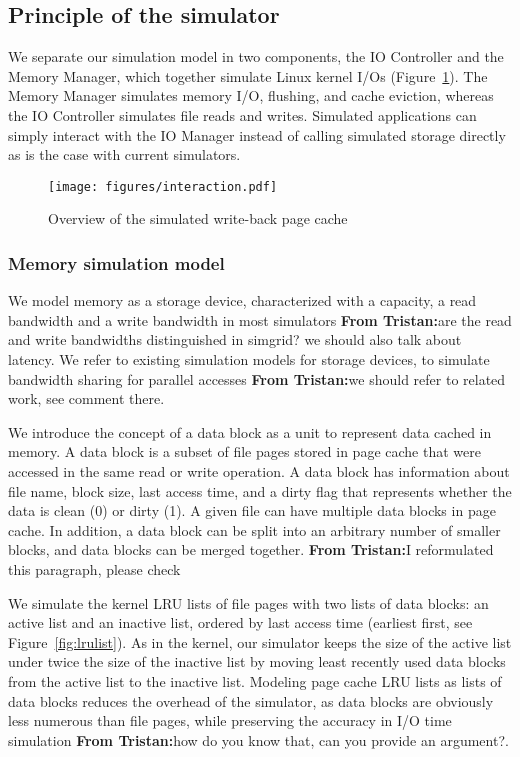 \documentclass[conference]{IEEEtran}
\newcommand{\tristan}[1]{\color{orange}\textbf{From Tristan:}#1\color{black}}
\begin{document}
		\subsection{Principle of the simulator}
	
            We separate our simulation model in two components, the IO
			Controller and the Memory Manager, which together simulate Linux
			kernel I/Os (Figure~\ref{fig:interaction}). The Memory Manager
			simulates memory I/O, flushing, and cache eviction, whereas the IO
			Controller simulates file reads and writes. Simulated applications
			can simply interact with the IO Manager instead of calling simulated
			storage directly as is the case with current simulators.

			\begin{figure}
   				\centering
   				\texttt{[image: figures/interaction.pdf]}
   				\caption{Overview of the simulated write-back page cache}\label{fig:interaction}
			\end{figure}	

			\subsubsection{Memory simulation model}
			
			We model memory as a storage device, characterized with a capacity,
			a read bandwidth and a write bandwidth in most simulators
			\tristan{are the read and write bandwidths distinguished in simgrid?
			we should also talk about latency}. We refer to existing simulation
			models for storage devices, to simulate bandwidth sharing for
			parallel accesses \tristan{we should refer to related work, see
			comment there}.

			We introduce the concept of a data block as a unit to represent data
			cached in memory. A data block is a subset of file pages stored in
			page cache that were accessed in the same read or write
			operation. A data block
			has information about file name, block size, last access time, and a
			dirty flag that represents whether the data is clean (0) or dirty
			(1). A given file can have multiple data blocks in page cache. In
			addition, a data block can be split into an arbitrary number of
			smaller blocks, and data blocks can be merged together.
			\tristan{I reformulated this paragraph, please check}
			
			We simulate the kernel LRU lists of file pages
			with two lists of data blocks: an active list and 
			an inactive list, ordered by last access time (earliest first, see Figure~\ref{fig:lrulist}).
			As in the kernel, our simulator keeps the size of the active list under
			twice the size of the inactive list by moving least recently 
			used data blocks from the active list to the inactive list. 
			Modeling page cache LRU lists as lists of data blocks reduces the
			overhead of the simulator, as data blocks are obviously less
			numerous than file pages, while preserving the accuracy in I/O time
			simulation \tristan{how do you know that, can you provide an argument?}.
\end{document}
